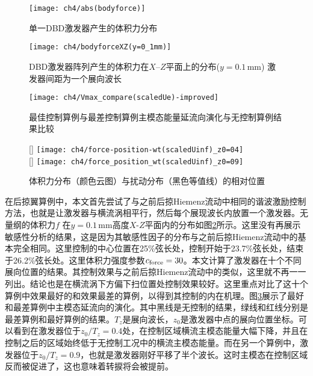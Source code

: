 \begin{figure}[htb]
\centering
  \texttt{[image: ch4/abs(bodyforce)]}
  \caption{单一DBD激发器产生的体积力分布}%
  \label{f:forceshape}
\end{figure}

\begin{figure}[htb]
\centering
  \texttt{[image: ch4/bodyforceXZ(y=0\_1mm)]}
  \caption{DBD激发器阵列产生的体积力在$X$--$Z$平面上的分布($y= 0.1$\,mm) 激发器间距为一个展向波长}%
  \label{f:force_XZ_1perwavelength}
\end{figure}

\begin{figure}[htb]
\centering
  \texttt{[image: ch4/Vmax\_compare(scaledUe)-improved]}
  \caption{最佳控制算例与最差控制算例主模态能量延流向演化与无控制算例结果比较}%
  \label{f:bestworst}
\end{figure}
\begin{figure}[htb]
\centering
  [\textwidth]
  {\texttt{[image: ch4/force-position-wt(scaledUinf)\_z0=04]}
}
  \\\bigskip
  [\textwidth]
  {
  \texttt{[image: ch4/force\_position\_wt(scaledUinf)\_z0=09]}
  }
  \caption{体积力分布（颜色云图）与扰动分布（黑色等值线）的相对位置}
  \label{f:pla_postion}
\end{figure}

在后掠翼算例中，本文首先尝试了与之前后掠Hiemenz流动中相同的谐波激励控制方法，也就是让激发器与横流涡相平行，然后每个展现波长内放置一个激发器。无量纲的体积力$f$ 在$y=0.1$\,mm高度$X$-$Z$平面内的分布如图\ref{f:force_XZ_1perwavelength}所示。这里没有再展示敏感性分析的结果，这是因为其敏感性因子的分布与之前后掠Hiemenz流动中的基本完全相同。这里控制的中心位置在25\%弦长处，控制开始于23.7\%弦长处，结束于26.2\%弦长处。这里体积力强度参数$c_{\rm force}= 30$。本文计算了激发器在十个不同展向位置的结果。其控制效果与之前后掠Hiemenz流动中的类似，这里就不再一一列出。结论也是在横流涡下方偏下扫位置处控制效果较好。这里重点对比了这十个算例中效果最好的和效果最差的算例，以得到其控制的内在机理。图\ref{f:bestworst}展示了最好和最差算例中主模态延流向的演化。其中黑线是无控制的结果，绿线和红线分别是最差算例和最好算例的结果。$T_z$是展向波长，$z_0$是激发器中点的展向位置坐标。可以看到在激发器位于$z_0/T_z=0.4$处，在控制区域横流主模态能量大幅下降，并且在控制之后的区域始终低于无控制工况中的横流主模态能量。而在另一个算例中，激发器位于$z_0/T_z=0.9$，也就是激发器刚好平移了半个波长。这时主模态在控制区域反而被促进了，这也意味着转捩将会被提前。

